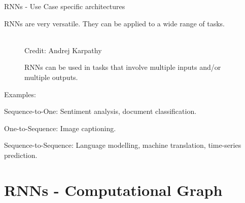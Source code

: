 \documentclass[11pt,compress,t,notes=noshow]{beamer}
\begin{document}
\begin{frame} {RNNs - Use Case specific architectures}

  \small{RNNs are very versatile. They can be applied to a wide range of tasks.
  
  \begin{figure}
      \centering
      \tiny{\\Credit: Andrej Karpathy}
      \caption{\footnotesize {RNNs can be used in tasks that involve multiple inputs and/or multiple outputs. }}
  \end{figure}
  Examples:}
  \begin{itemize}
    \item \small{Sequence-to-One: Sentiment analysis, document classification.
    \item One-to-Sequence: Image captioning.
    \item Sequence-to-Sequence: Language modelling, machine translation, time-series prediction.}
  \end{itemize}
\end{frame}



\section{RNNs - Computational Graph}
\end{document}

